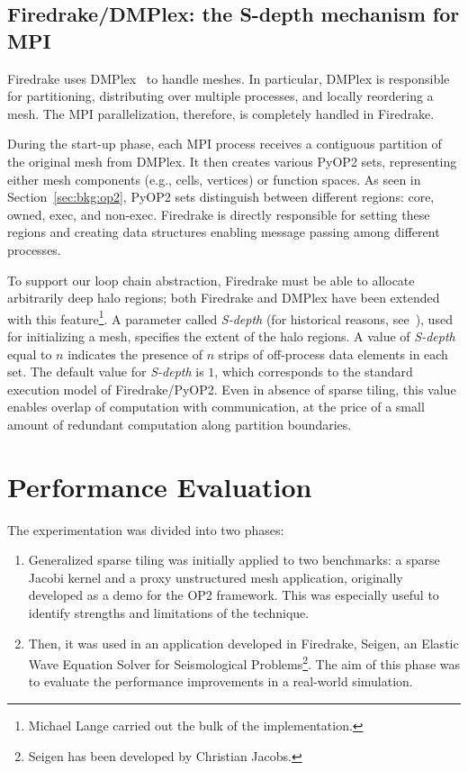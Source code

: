 \subsection{Firedrake/DMPlex: the S-depth mechanism for MPI}
\label{sec:tiling:impl-firedrake}
Firedrake uses DMPlex~\citep{dmplex-cite} to handle meshes. In particular, DMPlex is responsible for partitioning, distributing over multiple processes, and locally reordering a mesh. The MPI parallelization, therefore, is completely handled in Firedrake.

During the start-up phase, each MPI process receives a contiguous partition of the original mesh from DMPlex. It then creates various PyOP2 sets, representing either mesh components (e.g., cells, vertices) or function spaces. As seen in Section~\ref{sec:bkg:op2}, PyOP2 sets distinguish between different regions: core, owned, exec, and non-exec. Firedrake is directly responsible for setting these regions and creating data structures enabling message passing among different processes.

To support our loop chain abstraction, Firedrake must be able to allocate arbitrarily deep halo regions; both Firedrake and DMPlex have been extended with this feature\footnote{Michael Lange carried out the bulk of the implementation.}. A parameter called {\em S-depth} (for historical reasons, see~\cite{s-depth-paper}), used for initializing a mesh, specifies the extent of the halo regions. A value of {\em S-depth} equal to $n$ indicates the presence of $n$ strips of off-process data elements in each set. The default value for {\em S-depth} is $1$, which corresponds to the standard execution model of Firedrake/PyOP2. Even in absence of sparse tiling, this value enables overlap of computation with communication, at the price of a small amount of redundant computation along partition boundaries.


\section{Performance Evaluation}
The experimentation was divided into two phases:

\begin{enumerate}
\item Generalized sparse tiling was initially applied to two benchmarks: a sparse Jacobi kernel and a proxy unstructured mesh application, originally developed as a demo for the OP2 framework. This was especially useful to identify strengths and limitations of the technique.
\item Then, it was used in an application developed in Firedrake, Seigen, an Elastic Wave Equation Solver for Seismological Problems\footnote{Seigen has been developed by Christian Jacobs.}. The aim of this phase was to evaluate the performance improvements in a real-world simulation.
\end{enumerate}

